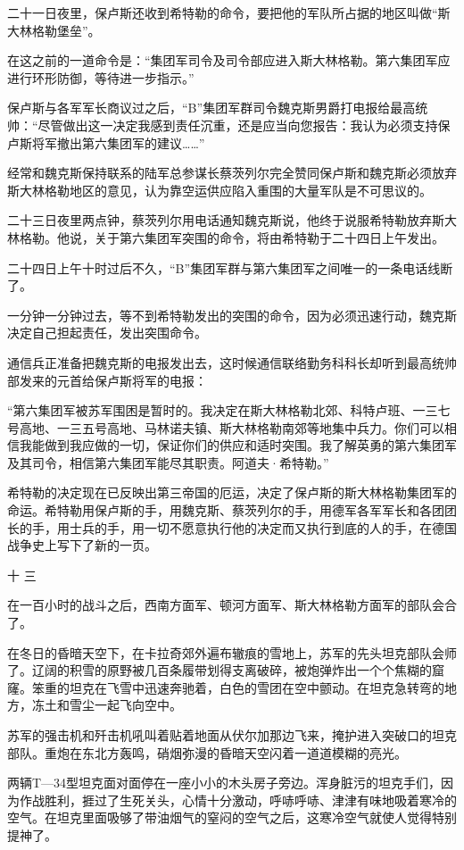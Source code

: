 二十一日夜里，保卢斯还收到希特勒的命令，要把他的军队所占据的地区叫做“斯大林格勒堡垒”。

在这之前的一道命令是：“集团军司令及司令部应进入斯大林格勒。第六集团军应进行环形防御，等待进一步指示。”

保卢斯与各军军长商议过之后，“B”集团军群司令魏克斯男爵打电报给最高统帅：“尽管做出这一决定我感到责任沉重，还是应当向您报告：我认为必须支持保卢斯将军撤出第六集团军的建议……”

经常和魏克斯保持联系的陆军总参谋长蔡茨列尔完全赞同保卢斯和魏克斯必须放弃斯大林格勒地区的意见，认为靠空运供应陷入重围的大量军队是不可思议的。

二十三日夜里两点钟，蔡茨列尔用电话通知魏克斯说，他终于说服希特勒放弃斯大林格勒。他说，关于第六集团军突围的命令，将由希特勒于二十四日上午发出。

二十四日上午十时过后不久，“B”集团军群与第六集团军之间唯一的一条电话线断了。

一分钟一分钟过去，等不到希特勒发出的突围的命令，因为必须迅速行动，魏克斯决定自己担起责任，发出突围命令。

通信兵正准备把魏克斯的电报发出去，这时候通信联络勤务科科长却听到最高统帅部发来的元首给保卢斯将军的电报：

“第六集团军被苏军围困是暂时的。我决定在斯大林格勒北郊、科特卢班、一三七号高地、一三五号高地、马林诺夫镇、斯大林格勒南郊等地集中兵力。你们可以相信我能做到我应做的一切，保证你们的供应和适时突围。我了解英勇的第六集团军及其司令，相信第六集团军能尽其职责。阿道夫·希特勒。”

希特勒的决定现在已反映出第三帝国的厄运，决定了保卢斯的斯大林格勒集团军的命运。希特勒用保卢斯的手，用魏克斯、蔡茨列尔的手，用德军各军军长和各团团长的手，用士兵的手，用一切不愿意执行他的决定而又执行到底的人的手，在德国战争史上写下了新的一页。

十 三

在一百小时的战斗之后，西南方面军、顿河方面军、斯大林格勒方面军的部队会合了。

在冬日的昏暗天空下，在卡拉奇郊外遍布辙痕的雪地上，苏军的先头坦克部队会师了。辽阔的积雪的原野被几百条履带划得支离破碎，被炮弹炸出一个个焦糊的窟窿。笨重的坦克在飞雪中迅速奔驰着，白色的雪团在空中颤动。在坦克急转弯的地方，冻土和雪尘一起飞向空中。

苏军的强击机和歼击机吼叫着贴着地面从伏尔加那边飞来，掩护进入突破口的坦克部队。重炮在东北方轰鸣，硝烟弥漫的昏暗天空闪着一道道模糊的亮光。

两辆T—34型坦克面对面停在一座小小的木头房子旁边。浑身脏污的坦克手们，因为作战胜利，捱过了生死关头，心情十分激动，呼哧呼哧、津津有味地吸着寒冷的空气。在坦克里面吸够了带油烟气的窒闷的空气之后，这寒冷空气就使人觉得特别提神了。

